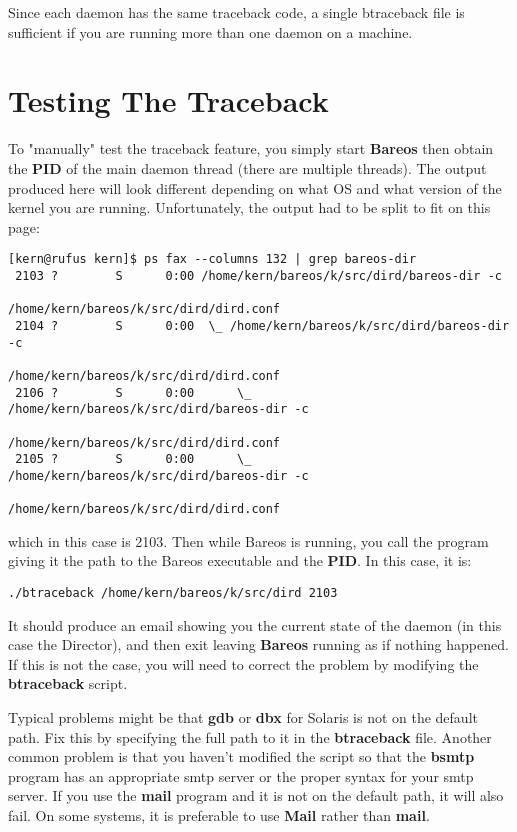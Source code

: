 Since each daemon has the same traceback code, a single btraceback file is
sufficient if you are running more than one daemon on a machine.

\section{Testing The Traceback}

To "manually" test the traceback feature, you simply start {\bf Bareos} then
obtain the {\bf PID} of the main daemon thread (there are multiple threads).
The output produced here will look different depending on what OS and what
version of the kernel you are running.
Unfortunately, the output had to be split to fit on this page:

\footnotesize
\begin{verbatim}
[kern@rufus kern]$ ps fax --columns 132 | grep bareos-dir
 2103 ?        S      0:00 /home/kern/bareos/k/src/dird/bareos-dir -c
                                       /home/kern/bareos/k/src/dird/dird.conf
 2104 ?        S      0:00  \_ /home/kern/bareos/k/src/dird/bareos-dir -c
                                       /home/kern/bareos/k/src/dird/dird.conf
 2106 ?        S      0:00      \_ /home/kern/bareos/k/src/dird/bareos-dir -c
                                       /home/kern/bareos/k/src/dird/dird.conf
 2105 ?        S      0:00      \_ /home/kern/bareos/k/src/dird/bareos-dir -c
                                       /home/kern/bareos/k/src/dird/dird.conf
\end{verbatim}
\normalsize

which in this case is 2103. Then while Bareos is running, you call the program
giving it the path to the Bareos executable and the {\bf PID}. In this case,
it is:

\footnotesize
\begin{verbatim}
./btraceback /home/kern/bareos/k/src/dird 2103
\end{verbatim}
\normalsize

It should produce an email showing you the current state of the daemon (in
this case the Director), and then exit leaving {\bf Bareos} running as if
nothing happened. If this is not the case, you will need to correct the
problem by modifying the {\bf btraceback} script.

Typical problems might be that {\bf gdb} or {\bf dbx} for Solaris is not on
the default path.  Fix this by specifying the full path to it in the {\bf
btraceback} file.  Another common problem is that you haven't modified the
script so that the {\bf bsmtp} program has an appropriate smtp server or
the proper syntax for your smtp server.  If you use the {\bf mail} program
and it is not on the default path, it will also fail.  On some systems, it
is preferable to use {\bf Mail} rather than {\bf mail}.

